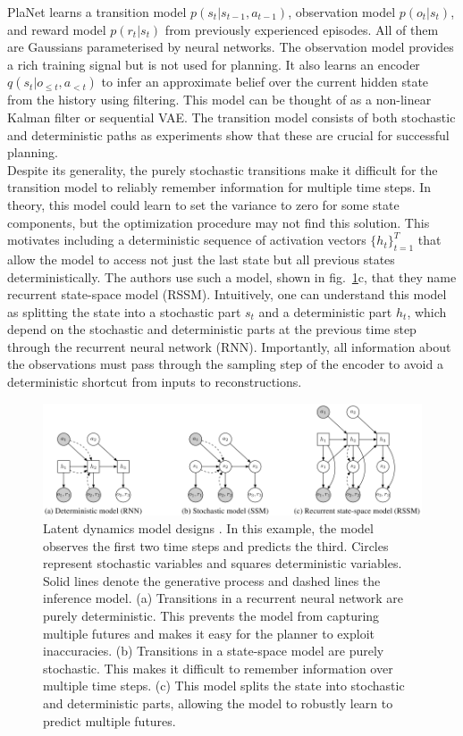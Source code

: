 PlaNet learns a transition model $p(s_t | s_{t-1}, a_{t-1})$, observation model $p(o_t | s_t)$, and reward model $p(r_t | s_t)$ from previously experienced episodes. All of them are Gaussians parameterised by neural networks. The observation model provides a rich training signal but is not used for planning. It also learns an encoder $q(s_t | o_{\leqslant t}, a_{< t})$ to infer an approximate belief over the current hidden state from the history using filtering. This model can be thought of as a non-linear Kalman filter or sequential VAE. The transition model consists of both stochastic and deterministic paths as experiments show that these are crucial for successful planning. \\
Despite its generality, the purely stochastic transitions make it difficult for the transition model to reliably remember information for multiple time steps. In theory, this model could learn to set the variance to zero for some state components, but the optimization procedure may not find this solution. This motivates including a deterministic sequence of activation vectors $\{h_t\}^T_{t=1}$ that allow the model to access not just the last state but all previous states deterministically. The authors use such a model, shown in fig.~\ref{Fig.PlaNetModelDesignes}c, that they name recurrent state-space model (RSSM). Intuitively, one can understand this model as splitting the state into a stochastic part $s_t$ and a deterministic part $h_t$, which depend on the stochastic and deterministic parts at the previous time step through the recurrent neural network (RNN). Importantly, all information about the observations must pass through the sampling step of the encoder to avoid a deterministic shortcut from inputs to reconstructions.

\begin{figure}[H]
\includegraphics[width=1.0\textwidth,keepaspectratio]{figures/PlaNet/models.png}
\caption[PlaNet latent dynamics model designs]{Latent dynamics model designs \protect\cite{Algo.PlaNet}. In this example, the model observes the first two time steps and predicts the third. Circles represent stochastic variables and squares deterministic variables. Solid lines denote the generative process and dashed lines the inference model. (a) Transitions in a recurrent neural network are purely deterministic. This prevents the model from capturing multiple futures and makes it easy for the planner to exploit inaccuracies. (b) Transitions in a state-space model are purely stochastic. This makes it difficult to remember information over multiple time steps. (c) This model splits the state into stochastic and deterministic parts, allowing the model to robustly learn to predict multiple futures.}
\label{Fig.PlaNetModelDesignes}
\end{figure}

